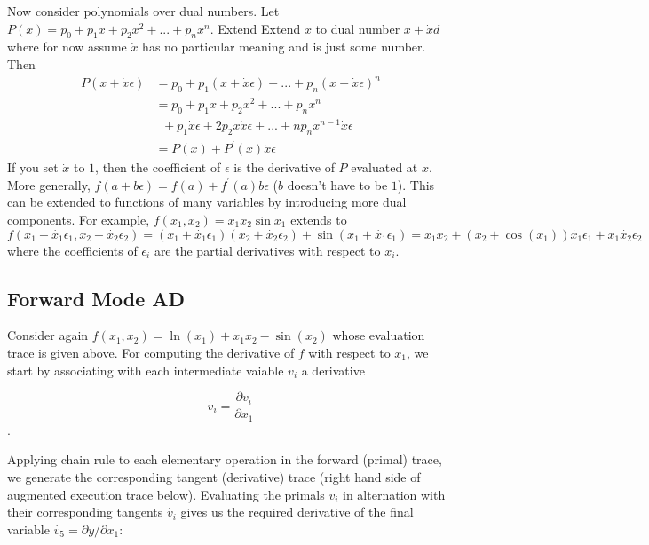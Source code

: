 \documentclass[11pt]{article}
\theoremstyle{definition}
\theoremstyle{plain}
\begin{document}
\noindent Now consider polynomials over dual numbers. Let $P(x)= p_0 + p_1x + p_2x^2 +
... + p_n x^n$. Extend Extend $x$ to dual number $x + \dot{x}d$ where for now
assume $\dot{x}$ has no particular meaning and is just some number. Then
\begin{align*}
    P(x + \dot{x} \epsilon) &= 
        p_0 + p_1(x + \dot{x}\epsilon) + ... + p_n(x + \dot{x}\epsilon)^n\\
    &=  p_0 + p_1x + p_2x^2 + ... + p_n x^n \\
    &\phantom{a} + p_1 \dot{x} \epsilon + 2 p_2 x \dot{x} \epsilon + ... +
        n p_n x^{n-1} \dot{x} \epsilon \\
    &= P(x) + P^\prime(x) \dot{x} \epsilon    
\end{align*}
\noindent If you set $\dot{x}$ to $1$, then the coefficient of $\epsilon$ is
the derivative of $P$ evaluated at $x$. More generally,
$f(a + b \epsilon) = f(a) + f^\prime(a) b \epsilon$ 
($b$ doesn't have to be $1$). This can be extended to functions of many variables
by introducing more dual components. For example, $f(x_1,x_2) = x_1 x_2 \sin x_1$
extends to 
$$f(x_1 + \dot{x_1} \epsilon_1, x_2 + \dot{x_2} \epsilon_2) = 
(x_1 + \dot{x_1}\epsilon_1)(x_2 + \dot{x_2}\epsilon_2) + \sin(x_1 + \dot{x_1}\epsilon_1) =
x_1 x_2 + (x_2 + \cos(x_1))\dot{x_1}\epsilon_1 + x_1 \dot{x_2} \epsilon_2 $$
\noindent where the coefficients of $\epsilon_i$ are the partial derivatives with respect
to $x_i$.

\subsection{Forward Mode AD}

Consider again $f(x_1,x_2) = \ln(x_1) + x_1x_2 - \sin(x_2)$ whose evaluation trace is 
given above. For computing the derivative of $f$ with respect to $x_1$, we 
start by associating with each intermediate vaiable $v_i$ a derivative

$$ \dot{v_i} = \frac{\partial v_i}{\partial x_1} $$.

\noindent Applying chain rule to each elementary operation in the forward (primal)
trace, we generate the corresponding tangent (derivative) trace (right hand side of
augmented execution trace below). Evaluating the primals $v_i$ in alternation
with their corresponding tangents $\dot{v_i}$ gives us the required derivative
of the final variable $\dot{v_5} = \partial y / \partial x_1$:
\end{document}

